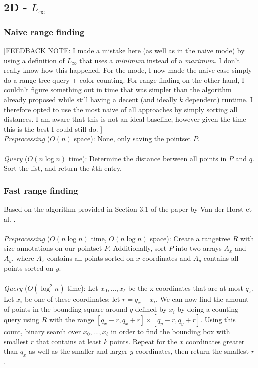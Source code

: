 \documentclass{article}
\newcommand{\fb}[1]{{\color{blue}#1}}
\newcommand{\fbnote}[1]{{\color{blue}[FEEDBACK NOTE: #1]\\}}
\begin{document}
\subsection{2D - $L_\infty$}
\subsubsection{Naive range finding}
\fbnote{I made a mistake here (as well as in the naive mode) by using a definition of $L_{\infty}$ that uses a \textit{minimum} instead of a \textit{maximum}. I don't really know how this happened. For the mode, I now made the naive case simply do a range tree query + color counting. For range finding on the other hand, I couldn't figure something out in time that was simpler than the algorithm already proposed while still having a decent (and ideally $k$ dependent) runtime. I therefore opted to use the most naive of all approaches by simply sorting all distances. I am aware that this is not an ideal baseline, however given the time this is the best I could still do. }
\fb{
\textit{Preprocessing} ($O(n)$ space): None, only saving the pointset $P$. \\\\
\textit{Query} ($O(n \log n)$ time): Determine the distance between all points in $P$ and $q$. Sort the list, and return the $k$th entry.
}
\subsubsection{Fast range finding}
Based on the algorithm provided in Section 3.1 of the paper by Van der Horst et
al. \cite{vanderhorst_et_al:LIPIcs.ESA.2022.67}.\\\\ 
\textit{Preprocessing} ($O(n \log n)$ time, $O(n \log n)$ space): Create a rangetree $R$ \fb{with size annotations} on our pointset $P$. Additionally, sort $P$ into two
arrays $A_x$ and $A_y$, where $A_x$ contains all points sorted on $x$
coordinates and $A_y$ contains all points sorted on $y$. \\\\ 
\textit{Query} ($O(\log^2 n)$ time):
Let $x_0, ..., x_\ell$ be the x-coordinates that are at most $q_x$. Let $x_i$
be one of these coordinates; let $r = q_x - x_i$. We can now find the amount of
points in the bounding square around $q$ defined by $x_i$ by doing a counting
query using $R$ with the range $[q_x - r, q_x + r] \times [q_y - r, q_y + r]$.
Using this count, binary search over $x_0, ..., x_\ell$ in order to find the
bounding box with smallest $r$ that contains at least $k$ points. Repeat for
the $x$ coordinates greater than $q_x$ as well as the smaller and larger $y$
coordinates, then return the smallest $r$.
\end{document}
